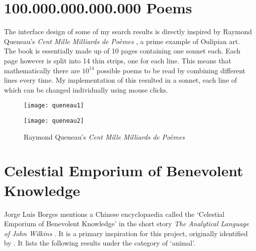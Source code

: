 \section{100.000.000.000.000 Poems}
\label{s:queneau}

The interface design of some of my search results is directly inspired by
Raymond Queneau's \textit{Cent Mille Milliards de Poèmes} \autocite*{Queneau1961}, a prime example of Oulipian art. The book is essentially made up of \num{10} pages containing one sonnet each. Each page however is split into \num{14} thin strips, one for each line. This means that mathematically there are $10^{14}$ possible poems to be read by combining different lines every time. My implementation of this resulted in a sonnet, each line of which can be changed individually using mouse clicks.

\begin{figure}[!htbp]
\centering
\begin{minipage}{.45\linewidth}
  \texttt{[image: queneau1]}
\end{minipage}
\hspace{.05\linewidth}
\begin{minipage}{.45\linewidth}
  \texttt{[image: queneau2]}
\end{minipage}
\caption[Queneau's \textit{Cent Mille Milliards de Poèmes}]{Raymond Queneau's \textit{Cent Mille Milliards de Poèmes}\footnotemark}
\label{fig:queneau12}
\end{figure}


\section{Celestial Emporium of Benevolent Knowledge}
\label{s:borges}

Jorge Luis Borges mentions a Chinese encyclopaedia called the `Celestial Emporium of Benevolent Knowledge' in the short story \textit{The Analytical Language of John Wilkins} \autocite*{Borges2000}. It is a primary inspiration for this project, originally identified by \autocite{Hendler2011, Hendler2013}. It lists the following results under the category of `animal'.

